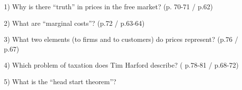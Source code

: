 1) Why is there “truth” in prices in the free market? (p. 70-71 / p.62)

2) What are “marginal costs”? (p.72 / p.63-64)

3) What two elements (to firms and to customers) do prices represent? (p.76 / p.67)

4) Which problem of taxation does Tim Harford describe? ( p.78-81 / p.68-72)

5) What is the “head start theorem”?